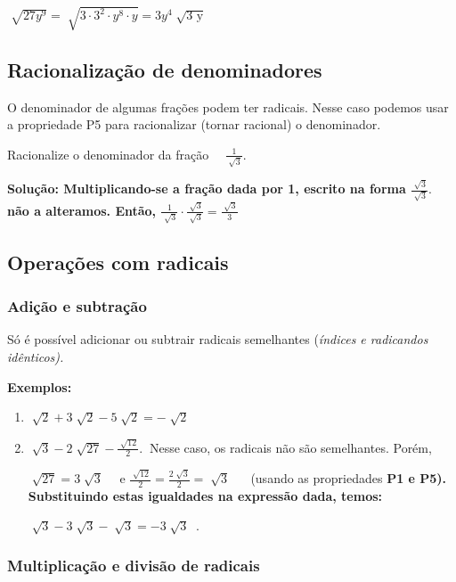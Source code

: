 \quad  \( \sqrt[]{27y^{9}}=\sqrt[]{3  \cdot 3^{2} \cdot y^{8} \cdot y}=3y^{4}\sqrt[]{\text{3 y}} \) ~ \qedsymbol{}

\subsection{Racionalização de denominadores}

O denominador de algumas frações podem ter radicais. Nesse caso podemos usar a propriedade P5 para racionalizar (tornar racional) o denominador. 

\begin{texemplo}
	
Racionalize o denominador da fração~~   \( \frac{1}{\sqrt[]{3}}. \)

\textbf{Solução: Multiplicando-se a fração dada por 1, escrito na forma  \( \frac{\sqrt[]{3}}{\sqrt[]{3}}. \) ~~ não a alteramos. Então,  \( \frac{1}{\sqrt[]{3}} \cdot \frac{\sqrt[]{3}}{\sqrt[]{3}}=\frac{\sqrt[]{3}}{3} \) ~ \qedsymbol{}}
\end{texemplo}
\subsection{Operações com radicais}

\subsubsection{Adição e subtração}

Só é possível adicionar ou subtrair radicais semelhantes (\textit{índices e radicandos idênticos). }

\textbf{Exemplos:}

\begin{enumerate}
	\item  \( \sqrt[]{2}+3\sqrt[]{2}-5\sqrt[]{2}=-\sqrt[]{2} \) 

	\item  \( \sqrt[]{3}-2\sqrt[]{27}-\frac{\sqrt[]{12}}{2}.~ \)  Nesse caso, os radicais não são semelhantes. Porém,

 \( \sqrt[]{27}=3\sqrt[]{3} \) ~~e   \( \frac{\sqrt[]{12}}{2}=\frac{2\sqrt[]{3}}{2}=\sqrt[]{3} \) ~~ (usando as propriedades \textbf{P1 e P5). Substituindo estas igualdades na expressão dada, temos:}

 \( \sqrt[]{3}-3\sqrt[]{3}-\sqrt[]{3}=-3\sqrt[]{3}~ \) .
\end{enumerate}
	\subsubsection{Multiplicação e divisão de radicais}

